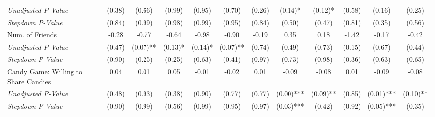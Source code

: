 \begin{tabular}{l c c c c c c c c c c c}
\quad \textit{Unadjusted P-Value} & (0.38) & (0.66) & (0.99) & (0.95) & (0.70) & (0.26) & (0.14)* & (0.12)* & (0.58) & (0.16) & (0.25) \\
\quad \textit{Stepdown P-Value} & (0.84) & (0.99) & (0.98) & (0.99) & (0.95) & (0.84) & (0.50) & (0.47) & (0.81) & (0.35) & (0.56) \\
Num. of Friends & -0.28 & -0.77 & -0.64 & -0.98 & -0.90 & -0.19 & 0.35 & 0.18 & -1.42 & -0.17 & -0.42 \\
\quad \textit{Unadjusted P-Value} & (0.47) & (0.07)** & (0.13)* & (0.14)* & (0.07)** & (0.74) & (0.49) & (0.73) & (0.15) & (0.67) & (0.44) \\
\quad \textit{Stepdown P-Value} & (0.90) & (0.25) & (0.25) & (0.63) & (0.41) & (0.97) & (0.73) & (0.98) & (0.36) & (0.63) & (0.65) \\
Candy Game: Willing to Share Candies & 0.04 & 0.01 & 0.05 & -0.01 & -0.02 & 0.01 & -0.09 & -0.08 & 0.01 & -0.09 & -0.08 \\
\quad \textit{Unadjusted P-Value} & (0.48) & (0.93) & (0.38) & (0.90) & (0.77) & (0.77) & (0.00)*** & (0.09)** & (0.85) & (0.01)*** & (0.10)** \\
\quad \textit{Stepdown P-Value} & (0.90) & (0.99) & (0.56) & (0.99) & (0.95) & (0.97) & (0.03)*** & (0.42) & (0.92) & (0.05)*** & (0.35) \\
\bottomrule
\end{tabular}
